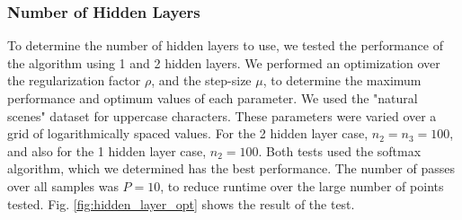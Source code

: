 \documentclass[journal,a4paper,onecolumn,11pt]{IEEEtran}
\begin{document}
\subsubsection{Number of Hidden Layers}
To determine the number of hidden layers to use, we tested the performance of the algorithm using 1 and 2 hidden layers. We performed an optimization over the regularization factor $\rho$, and the step-size $\mu$, to determine the maximum performance and optimum values of each parameter. We used the "natural scenes" dataset for uppercase characters. These parameters were varied over a grid of logarithmically spaced values. For the 2 hidden layer case, $n_2=n_3=100$, and also for the 1 hidden layer case, $n_2=100$. Both tests used the softmax algorithm, which we determined has the best performance. The number of passes over all samples was $P=10$, to reduce runtime over the large number of points tested. Fig. \ref{fig:hidden_layer_opt} shows the result of the test.
\end{document}
